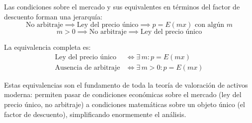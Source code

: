 \documentclass[12pt]{article}
\begin{document}
Las condiciones sobre el mercado y sus equivalentes en t\'erminos del factor de descuento forman una jerarqu\'ia:
\begin{equation}
    \text{No arbitraje} \implies \text{Ley del precio \'unico} \implies p = E(mx) \text{ con alg\'un } m
\end{equation}
\begin{equation}
    m > 0 \implies \text{No arbitraje} \implies \text{Ley del precio \'unico}
\end{equation}

La equivalencia completa es:
\begin{align}
    \text{Ley del precio \'unico} &\iff \exists\, m : p = E(mx) \\
    \text{Ausencia de arbitraje} &\iff \exists\, m > 0 : p = E(mx)
\end{align}

Estas equivalencias son el fundamento de toda la teor\'ia de valoraci\'on de activos moderna: permiten pasar de condiciones econ\'omicas sobre el mercado (ley del precio \'unico, no arbitraje) a condiciones matem\'aticas sobre un objeto \'unico (el factor de descuento), simplificando enormemente el an\'alisis.
\end{document}
